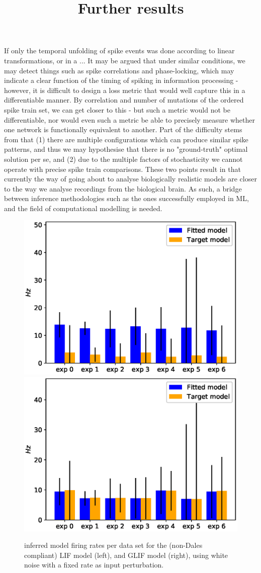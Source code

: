 \documentclass[mphil,deptreport,ianc]{infthesis} %
\begin{document}
If only the temporal unfolding of spike events was done according to linear transformations, or in a ...
It may be argued that under similar conditions, we may detect things such as spike correlations and phase-locking, which may indicate a clear function of the timing of spiking in information processing - however, it is difficult to design a loss metric that would well capture this in a differentiable manner.
By correlation and number of mutations of the ordered spike train set, we can get closer to this - but such a metric would not be differentiable, nor would even such a metric be able to precisely measure whether one network is functionally equivalent to another.
Part of the difficulty stems from that (1) there are multiple configurations which can produce similar spike patterns, and thus we may hypothesise that there is no "ground-truth" optimal solution per se, and (2) due to the multiple factors of stochasticity we cannot operate with precise spike train comparisons. These two points result in that currently the way of going about to analyse biologically realistic models are closer to the way we analyse recordings from the biological brain. As such, a bridge between inference methodologies such as the ones successfully employed in ML, and the field of computational modelling is needed.






\appendix\label{further_results}
\title{Further results}

\begin{figure}
    \centering
    \includegraphics[width=0.49\columnwidth]{figures/sleep/approx_rate_across_exp_LIF_no_cell_types_frd_vs_fitted.eps}
    \includegraphics[width=0.49\columnwidth]{figures/sleep/approx_rate_across_exp_GLIF_no_cell_types_frd_vs_fitted.eps}
    \caption{inferred model firing rates per data set for the (non-Dales compliant) LIF model (left), and GLIF model (right), using white noise with a fixed rate as input perturbation.}
    \label{fig:approx_rates_sleep_exps_LIF}
\end{figure}
\end{document}
